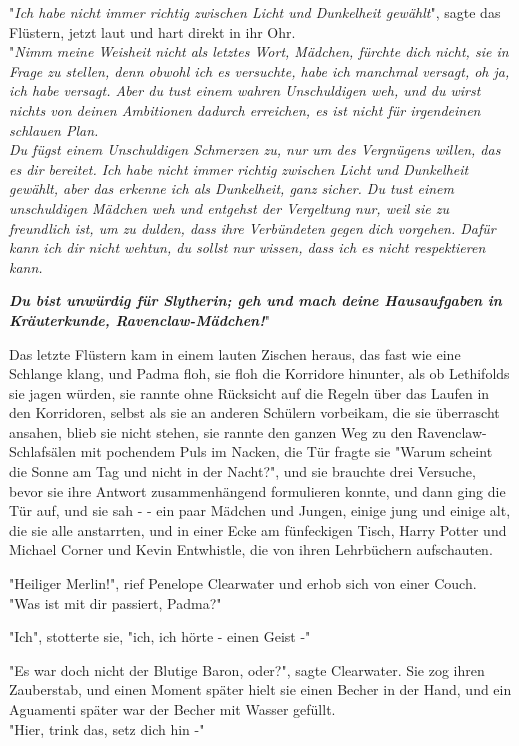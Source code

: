 {"\emph{Ich habe nicht immer richtig zwischen Licht und Dunkelheit gewählt}", sagte das Flüstern, jetzt laut und hart direkt in ihr Ohr.\\ "\emph{Nimm meine Weisheit nicht als letztes Wort, Mädchen, fürchte dich nicht, sie in Frage zu stellen, denn obwohl ich es versuchte, habe ich manchmal versagt, oh ja, ich habe versagt. Aber du tust einem wahren Unschuldigen weh, und du wirst nichts von deinen Ambitionen dadurch erreichen, es ist nicht für irgendeinen schlauen Plan.\\ Du fügst einem Unschuldigen Schmerzen zu, nur um des Vergnügens willen, das es dir bereitet. Ich habe nicht immer richtig zwischen Licht und Dunkelheit gewählt, aber das erkenne ich als Dunkelheit, ganz sicher. Du tust einem unschuldigen Mädchen weh und entgehst der Vergeltung nur, weil sie zu freundlich ist, um zu dulden, dass ihre Verbündeten gegen dich vorgehen. Dafür kann ich dir nicht wehtun, du sollst nur wissen, dass ich es nicht respektieren kann.}

\textbf{\emph{Du bist unwürdig für Slytherin; geh und mach deine Hausaufgaben in Kräuterkunde, Ravenclaw-Mädchen!}}"

Das letzte Flüstern kam in einem lauten Zischen heraus, das fast wie eine Schlange klang, und Padma floh, sie floh die Korridore hinunter, als ob Lethifolds sie jagen würden, sie rannte ohne Rücksicht auf die Regeln über das Laufen in den Korridoren, selbst als sie an anderen Schülern vorbeikam, die sie überrascht ansahen, blieb sie nicht stehen, sie rannte den ganzen Weg zu den Ravenclaw-Schlafsälen mit pochendem Puls im Nacken, die Tür fragte sie "Warum scheint die Sonne am Tag und nicht in der Nacht?", und sie brauchte drei Versuche, bevor sie ihre Antwort zusammenhängend formulieren konnte, und dann ging die Tür auf, und sie sah - - ein paar Mädchen und Jungen, einige jung und einige alt, die sie alle anstarrten, und in einer Ecke am fünfeckigen Tisch, Harry Potter und Michael Corner und Kevin Entwhistle, die von ihren Lehrbüchern aufschauten.

"Heiliger Merlin!", rief Penelope Clearwater und erhob sich von einer Couch.\\ "Was ist mit dir passiert, Padma?"

"Ich", stotterte sie, "ich, ich hörte - einen Geist -"

"Es war doch nicht der Blutige Baron, oder?", sagte Clearwater. Sie zog ihren Zauberstab, und einen Moment später hielt sie einen Becher in der Hand, und ein Aguamenti später war der Becher mit Wasser gefüllt.\\ "Hier, trink das, setz dich hin -"

}
